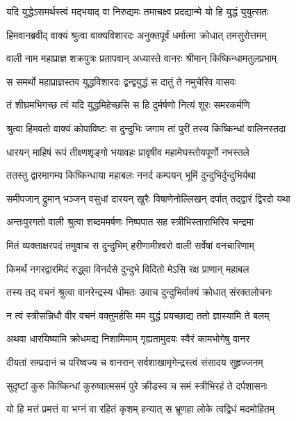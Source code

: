 \twolineshloka
{यदि युद्धेऽसमर्थस्त्वं मद्भयाद् वा निरुद्यमः}
{तमाचक्ष्व प्रदद्यान्मे यो हि युद्धं युयुत्सतः} %

\twolineshloka
{हिमवानब्रवीद् वाक्यं श्रुत्वा वाक्यविशारदः}
{अनुक्तपूर्वं धर्मात्मा क्रोधात् तमसुरोत्तमम्} %

\twolineshloka
{वाली नाम महाप्राज्ञ शक्रपुत्रः प्रतापवान्}
{अध्यास्ते वानरः श्रीमान् किष्किन्धामतुलप्रभाम्} %

\twolineshloka
{स समर्थो महाप्राज्ञस्तव युद्धविशारदः}
{द्वन्द्वयुद्धं स दातुं ते नमुचेरिव वासवः} %

\twolineshloka
{तं शीघ्रमभिगच्छ त्वं यदि युद्धमिहेच्छसि}
{स हि दुर्मर्षणो नित्यं शूरः समरकर्मणि} %

\twolineshloka
{श्रुत्वा हिमवतो वाक्यं कोपाविष्टः स दुन्दुभिः}
{जगाम तां पुरीं तस्य किष्किन्धां वालिनस्तदा} %

\twolineshloka
{धारयन् माहिषं रूपं तीक्ष्णशृङ्गो भयावहः}
{प्रावृषीव महामेघस्तोयपूर्णो नभस्तले} %

\twolineshloka
{ततस्तु द्वारमागम्य किष्किन्धाया महाबलः}
{ननर्द कम्पयन् भूमिं दुन्दुभिर्दुन्दुभिर्यथा} %

\twolineshloka
{समीपजान् द्रुमान् भञ्जन् वसुधां दारयन् खुरैः}
{विषाणेनोल्लिखन् दर्पात् तद्द्वारं द्विरदो यथा} %

\twolineshloka
{अन्तःपुरगतो वाली श्रुत्वा शब्दममर्षणः}
{निष्पपात सह स्त्रीभिस्ताराभिरिव चन्द्रमा} %

\twolineshloka
{मितं व्यक्ताक्षरपदं तमुवाच स दुन्दुभिम्}
{हरीणामीश्वरो वाली सर्वेषां वनचारिणाम्} %

\twolineshloka
{किमर्थं नगरद्वारमिदं रुद्ध्वा विनर्दसे}
{दुन्दुभे विदितो मेऽसि रक्ष प्राणान् महाबल} %

\twolineshloka
{तस्य तद् वचनं श्रुत्वा वानरेन्द्रस्य धीमतः}
{उवाच दुन्दुभिर्वाक्यं क्रोधात् संरक्तलोचनः} %

\twolineshloka
{न त्वं स्त्रीसन्निधौ वीर वचनं वक्तुमर्हसि}
{मम युद्धं प्रयच्छाद्य ततो ज्ञास्यामि ते बलम्} %

\twolineshloka
{अथवा धारयिष्यामि क्रोधमद्य निशामिमाम्}
{गृह्यतामुदयः स्वैरं कामभोगेषु वानर} %

\twolineshloka
{दीयतां सम्प्रदानं च परिष्वज्य च वानरान्}
{सर्वशाखामृगेन्द्रस्त्वं संसादय सुहृज्जनम्} %

\twolineshloka
{सुदृष्टां कुरु किष्किन्धां कुरुष्वात्मसमं पुरे}
{क्रीडस्व च समं स्त्रीभिरहं ते दर्पशासनः} %

\twolineshloka
{यो हि मत्तं प्रमत्तं वा भग्नं वा रहितं कृशम्}
{हन्यात् स भ्रूणहा लोके त्वद्विधं मदमोहितम्} %

